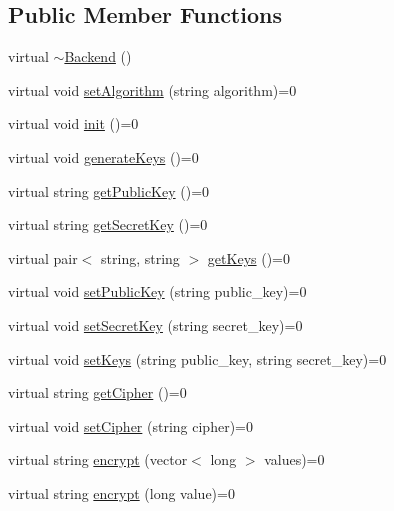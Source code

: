 \subsection*{Public Member Functions}
\begin{DoxyCompactItemize}
\item 
virtual \mbox{\hyperlink{classhomomorphine_1_1_backend_a24577dcf41802199e2286a4378214cd5}{$\sim$\+Backend}} ()
\item 
virtual void \mbox{\hyperlink{classhomomorphine_1_1_backend_a69cc49ddff047e257a7d793ac240b08b}{set\+Algorithm}} (string algorithm)=0
\item 
virtual void \mbox{\hyperlink{classhomomorphine_1_1_backend_a8ac9e6b5d747ecd4db48d1bf1c1b7a8c}{init}} ()=0
\item 
virtual void \mbox{\hyperlink{classhomomorphine_1_1_backend_a88cd9469f1394a0a2d15c2f603280763}{generate\+Keys}} ()=0
\item 
virtual string \mbox{\hyperlink{classhomomorphine_1_1_backend_a8bba422ac5b13e77030a884cfd6a0463}{get\+Public\+Key}} ()=0
\item 
virtual string \mbox{\hyperlink{classhomomorphine_1_1_backend_a456cb97febfd3819ab400d9583c97153}{get\+Secret\+Key}} ()=0
\item 
virtual pair$<$ string, string $>$ \mbox{\hyperlink{classhomomorphine_1_1_backend_a4c1062db09f76c74640f70b451d70729}{get\+Keys}} ()=0
\item 
virtual void \mbox{\hyperlink{classhomomorphine_1_1_backend_a7c1236495e4aa6481871852edfff327a}{set\+Public\+Key}} (string public\+\_\+key)=0
\item 
virtual void \mbox{\hyperlink{classhomomorphine_1_1_backend_af20abcf14fae6a93c02e6470ea111123}{set\+Secret\+Key}} (string secret\+\_\+key)=0
\item 
virtual void \mbox{\hyperlink{classhomomorphine_1_1_backend_a48558b9cf1c143d92d83fa095dd84413}{set\+Keys}} (string public\+\_\+key, string secret\+\_\+key)=0
\item 
virtual string \mbox{\hyperlink{classhomomorphine_1_1_backend_a6c6ed25dec9809b3f216e185e8026e97}{get\+Cipher}} ()=0
\item 
virtual void \mbox{\hyperlink{classhomomorphine_1_1_backend_a29f49f5c862cf090ac98ade663e67c64}{set\+Cipher}} (string cipher)=0
\item 
virtual string \mbox{\hyperlink{classhomomorphine_1_1_backend_ade5ea47921fae4c5117e11ed1097b7ce}{encrypt}} (vector$<$ long $>$ values)=0
\item 
virtual string \mbox{\hyperlink{classhomomorphine_1_1_backend_a05ee154a7a5dd88a4a0589165fae9f97}{encrypt}} (long value)=0

\end{DoxyCompactItemize}
